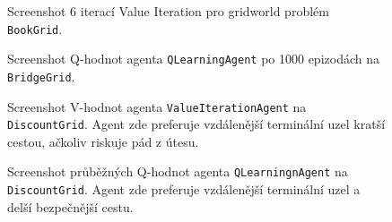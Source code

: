 \label{pril:experobr}
\begin{figure}[!htbp]
\begin{center}
  \caption{Screenshot 6 iterací Value Iteration pro gridworld problém \texttt{BookGrid}.}
  \label{img:valiter6}
\end{center}
\end{figure}

\begin{figure}[!htbp]
\begin{center}
  \caption{Screenshot Q-hodnot agenta \texttt{QLearningAgent} po 1000 epizodách na \texttt{BridgeGrid}.}
  \label{img:bridgeq}
\end{center}
\end{figure}

\begin{figure}[!htbp]
\begin{center}
  \caption{Screenshot V-hodnot agenta \texttt{ValueIterationAgent} na \texttt{DiscountGrid}. Agent zde preferuje vzdálenější terminální uzel kratší cestou, ačkoliv riskuje pád z útesu.}
  \label{img:discountPolicy}
\end{center}
\end{figure}

\begin{figure}[!htbp]
\begin{center}
  \caption{Screenshot průběžných Q-hodnot agenta \texttt{QLearningnAgent} na \texttt{DiscountGrid}. Agent zde preferuje vzdálenější terminální uzel a delší bezpečnější cestu.}
  \label{img:discountPolicyQ}
\end{center}
\end{figure}


